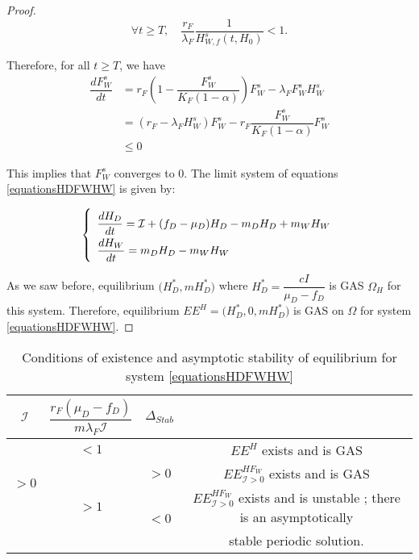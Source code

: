 \documentclass{article}
\newcommand{\lfw}{\lambda_{F}}
\newcommand{\lfw}{\lambda_{F}}
\newcommand{\cI}{\mathcal{I}}
\begin{document}
\begin{proof}
\begin{equation}
\forall t \geq T, \quad \dfrac{r_F}{\lfw}\dfrac{1}{H_{W, f}^s(t, H_0)} < 1.
\end{equation}

\medskip
Therefore, for all $t \geq T$, we have
\begin{align*}
\dfrac{dF_W^s}{dt} &= r_F \left(1 - \dfrac{F_W^s}{K_F(1-\alpha)} \right) F_W^s - \lfw F_W^s H_W^s \\
&= \left(r_F- \lfw H_W^s\right) F_W^s - r_F \dfrac{F_W^s}{K_F(1-\alpha)}F_W^s \\
& \leq 0
\end{align*}

This implies that $F_W^s$ converges to 0. The limit system of equations \eqref{equationsHDFWHW} is given by:

\begin{equation}
\def\arraystretch{2}
\left\{ \begin{array}{l}
\dfrac{dH_D}{dt}= \cI + (f_D - \mu_D) H_D - m_D H_D + m_W H_W  \\
\dfrac{dH_W}{dt}= m_D H_D - m_W H_W
\end{array}\right.
\end{equation}

As we saw before, equilibrium $\Big(H_D^*, mH_D^*\Big)$ where $H_D^* = \dfrac{cI}{\mu_D - f_D}$ is GAS $\Omega_H$ for this system. Therefore, equilibrium $EE^{H} = \Big(H_D^*, 0, mH_D^*\Big)$ is GAS on $\Omega$ for system \eqref{equationsHDFWHW}.
\end{proof}


\begin{table}[!ht]
\def\arraystretch{2}
\centering
\begin{tabular}{c|c|c|c}
$\cI$ & $\dfrac{r_F(\mu_D-f_D)}{m\lfw \cI} $ & $\Delta_{Stab}$ & \\
\hline
\multirow{3}{*}{$>0$} & $<1$ & &$EE^{H}$ exists and is GAS \\
\cline{2-4}
 & \multirow{3}{*}{$> 1$}  & $>0$ &$EE^{HF_W}_{\cI>0}$ exists and is GAS\\
 \cline{3-4}
 & & \multirow{2}{*}{$ < 0$} & $EE^{HF_W}_{\cI>0}$ exists and is unstable ; there is an asymptotically \\
 & & &  stable periodic solution. \\
\end{tabular}
\caption{\centering Conditions of existence and asymptotic stability of equilibrium for system \eqref{equationsHDFWHW}}
\end{table}
\end{document}
